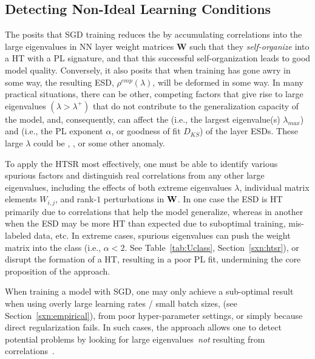 \subsection{Detecting Non-Ideal Learning Conditions}
\label{sxn:HT_ESDs}


The \HTSR \Phenomenology posits that SGD training reduces the \emph{\TrainingError} by accumulating correlations into the large eigenvalues
in NN layer weight matrices  $\mathbf{W}$ such that they \emph{self-organize} into a HT with a PL signature,
and that this successful self-organization leads to good model quality.
Conversely, it also posits that when training has gone awry in some way, the resulting ESD, $\rho^{emp}(\lambda)$, will
be deformed in some way.   
In many practical situations, there can be other, 
competing factors that give rise to large eigenvalues $(\lambda>\lambda^{+})$
that do not contribute to the generalization capacity of the model, and, consequently, 
can affect the \Scale (i.e., the largest eigenvalue(s) $\lambda_{max}$) 
and \Shape (i.e., the PL exponent $\alpha$, or goodness of fit $D_{KS}$) of the layer ESDs.
These large $\lambda$ could be \DragonKings, \emph{\CorrelationTraps}, or some other anomaly.

To apply the HTSR \Phenomenology most effectively, one must be able to identify various spurious factors and
distinguish real correlations from any other large eigenvalues, including the effects of both
extreme eigenvalues $\lambda$, individual matrix elements $W_{i,j}$, and rank-$1$ perturbations in ${\mathbf{W}}$.
In one case the ESD is HT primarily due to correlations that help the model generalize, whereas
in another when the ESD may be more HT than expected due to suboptimal training, mis-labeled data, etc.
In extreme cases, spurious eigenvalues can push the weight matrix
into the \VeryHeavyTailed \Universality class (i.e., $\alpha<2$. See Table~\ref{tab:Uclass}, Section~\ref{sxn:htsr}), or
disrupt the formation of a HT, resulting in a poor PL fit, undermining the core proposition of the  \HTSR approach.

When training a model with SGD, one may only achieve  a sub-optimal result
when using overly large learning rates / small batch sizes, (see Section~\ref{sxn:empirical}),
from poor hyper-parameter settings,
or simply because direct regularization fails. In such cases, the \HTSR approach allows one to detect
potential problems by looking for large eigenvalues~\emph{not} resulting from correlations~\cite{GSZ20_TR}.

